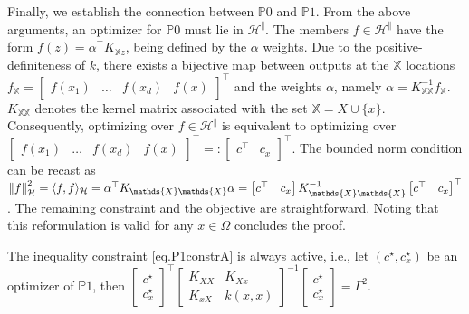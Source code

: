 \begin{my_proof}
	Finally, we establish the connection between $\mathds{P}0$ and $\mathds{P}1$. From the above arguments, an optimizer for $\mathds{P}0$ must lie in $\mathcal{H}^\Vert$. The members $f \in \mathcal{H}^\Vert$ have the form $f(z) = \alpha^\top K_{\mathds{X}z}$, being defined by the $\alpha$ weights. Due to the positive-definiteness of $k$, there exists a bijective map between outputs at the $\mathds{X}$ locations $f_{\mathds{X}} = \begin{bmatrix} f(x_1) & \dots & f(x_d) & f(x) \end{bmatrix}^\top$ and the weights $\alpha$, namely $\alpha = K_{\mathds{X}\mathds{X}}^{-1}f_{\mathds{X}}$. $K_{\mathds{X}\mathds{X}}$ denotes the kernel matrix associated with the set $\mathds{X} = X \cup \{x\}$. Consequently, optimizing over $f \in \mathcal{H}^\Vert$ is equivalent to optimizing over $\begin{bmatrix} f(x_1) & \dots & f(x_d) & f(x) \end{bmatrix}^\top =: \begin{bmatrix}c^\top & c_x\end{bmatrix}^\top$. The bounded norm condition can be recast as $\rknorm{f}^2 = \rkinner{f}{f} = \alpha^\top K_{\mathds{X}\mathds{X}} \alpha = \begin{bmatrix}c^\top & c_x\end{bmatrix} K_{\mathds{X}\mathds{X}}^{-1} \begin{bmatrix}c^\top & c_x\end{bmatrix}^\top$. The remaining constraint and the objective are straightforward. Noting that this reformulation is valid for any $x \in \Omega$ concludes the proof. 
\end{my_proof}

\begin{proposition} 
	\label{prop.complex_constraint_always_active}
	The inequality constraint \eqref{eq.P1constrA} is always active, i.e., let $(c^\star,c_x^\star)$ be an optimizer of $\mathds{P}1$, then $\begin{bmatrix}
		c ^\star\\
		c_x^\star
	\end{bmatrix}^\top 
	\begin{bmatrix}
		K_{XX} & K_{Xx} \\
		K_{xX} & k(x,x)
	\end{bmatrix}^{-1} 
	\begin{bmatrix}
		c^\star \\
		c_x^\star
	\end{bmatrix} = \Gamma^2 $. 
\end{proposition}
\begin{my_proof}
\end{my_proof}

